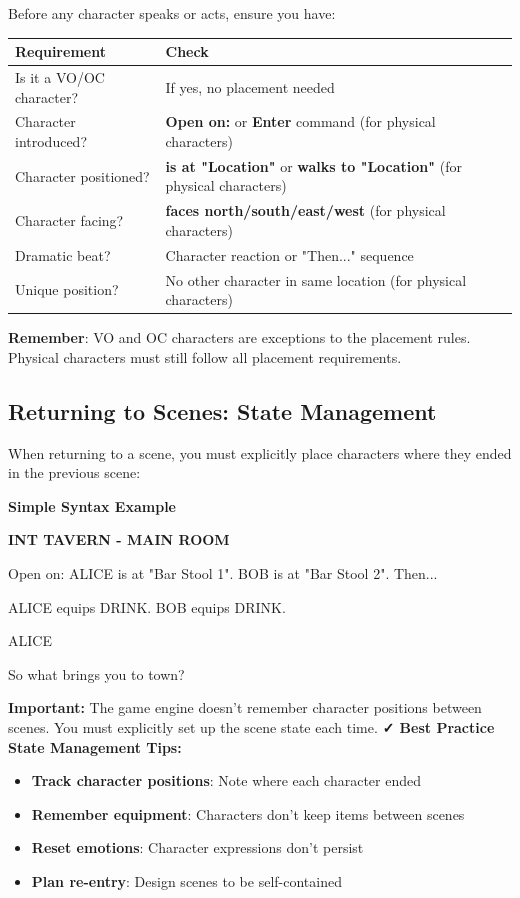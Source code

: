 \documentclass[11pt,letterpaper,oldstylefigures]{memoir}
\newcommand{\slugline}[1]{\nobreak\textbf{\MakeUppercase{#1}}\par\nobreak\vspace{1\baselineskip}}
\newcommand{\speaker}[1]{\nobreak\hspace*{0.333\textwidth}\MakeUppercase{#1}\par\nobreak\vspace{0.5\baselineskip}}
\newcommand{\dialogue}[1]{\nobreak\hspace*{0.25\textwidth}\begin{minipage}{0.5\textwidth}#1\end{minipage}\par\vspace{1\baselineskip}}
\newcommand{\stagedir}[1]{#1\par\vspace{1\baselineskip}}
\newenvironment{FountainExample}
  {\begingroup
  \ttfamily\small
   \setlength{\parindent}{0pt}
  \setlength{\parskip}{0.5em}
  \allowdisplaybreaks
  \setlength{\displaywidowpenalty}{0}
  \setlength{\widowpenalty}{0}
  \setlength{\clubpenalty}{0}
  \setlength{\interlinepenalty}{0}
}
  {\endgroup}
\newenvironment{SimpleExample}
{\begingroup
\small
\setlength{\parindent}{0pt}
\setlength{\parskip}{0.5em}
\allowdisplaybreaks
\setlength{\displaywidowpenalty}{0}
\setlength{\widowpenalty}{0}
\setlength{\clubpenalty}{0}
\setlength{\interlinepenalty}{0}
\begin{tcolorbox}[
    colback=blue!5,
    colframe=blue!75!black,
    boxrule=0.5pt,
    arc=2pt,
    left=0.5em,
    right=0.5em,
    top=0.25em,
    bottom=0.25em
]
\textbf{Simple Syntax Example}
\end{tcolorbox}\par
}
{\endgroup}
\newcommand{\fountain}[1]{\textbf{#1}}
\begin{document}
Before any character speaks or acts, ensure you have:

\begin{center}
\begin{tabular}{|l|l|}
\hline
\textbf{Requirement} & \textbf{Check} \\
\hline
Is it a VO/OC character? & If yes, no placement needed \\
Character introduced? & \fountain{Open on:} or \fountain{Enter} command (for physical characters) \\
Character positioned? & \fountain{is at "Location"} or \fountain{walks to "Location"} (for physical characters) \\
Character facing? & \fountain{faces north/south/east/west} (for physical characters) \\
Dramatic beat? & Character reaction or "Then..." sequence \\
Unique position? & No other character in same location (for physical characters) \\
\hline
\end{tabular}
\end{center}

\textbf{Remember}: VO and OC characters are exceptions to the placement rules. Physical characters must still follow all placement requirements.

\subsection{Returning to Scenes: State Management}

When returning to a scene, you must explicitly place characters where they ended in the previous scene:

\begin{SimpleExample}
\begin{FountainExample}
\slugline{INT TAVERN - MAIN ROOM}

\stagedir{Open on: ALICE is at "Bar Stool 1". BOB is at "Bar Stool 2". Then...}
\stagedir{ALICE equips DRINK. BOB equips DRINK.}

\speaker{ALICE}
\dialogue{So what brings you to town?}
\end{FountainExample}
\end{SimpleExample}
\textbf{Important:} The game engine doesn't remember character positions between scenes. You must explicitly set up the scene state each time.
\textbf{✓ Best Practice}
\textbf{State Management Tips:}
\begin{itemize}
\item \textbf{Track character positions}: Note where each character ended
\item \textbf{Remember equipment}: Characters don't keep items between scenes
\item \textbf{Reset emotions}: Character expressions don't persist
\item \textbf{Plan re-entry}: Design scenes to be self-contained
\end{itemize}
\end{document}
